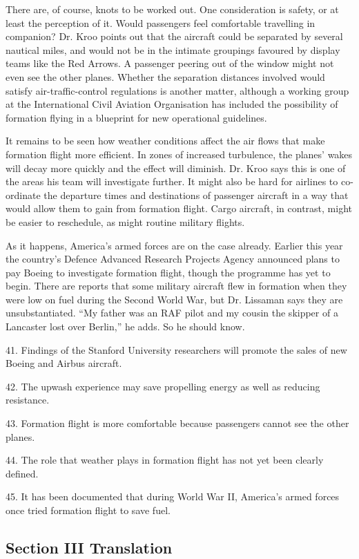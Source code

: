 \documentclass[UTF8,11pt]{ctexart}
\begin{document}
There are, of course, knots to be worked out. One consideration is safety, or at least the perception of it. Would passengers feel comfortable travelling in companion? Dr. Kroo points out that the aircraft could be separated by several nautical miles, and would not be in the intimate groupings favoured by display teams like the Red Arrows. A passenger peering out of the window might not even see the other planes. Whether the separation distances involved would satisfy air-traffic-control regulations is another matter, although a working group at the International Civil Aviation Organisation has included the possibility of formation flying in a blueprint for new operational guidelines.


It remains to be seen how weather conditions affect the air flows that make formation flight more efficient. In zones of increased turbulence, the planes’ wakes will decay more quickly and the effect will diminish. Dr. Kroo says this is one of the areas his team will investigate further. It might also be hard for airlines to co-ordinate the departure times and destinations of passenger aircraft in a way that would allow them to gain from formation flight. Cargo aircraft, in contrast, might be easier to reschedule, as might routine military flights.


As it happens, America’s armed forces are on the case already. Earlier this year the country’s Defence Advanced Research Projects Agency announced plans to pay Boeing to investigate formation flight, though the programme has yet to begin. There are reports that some military aircraft flew in formation when they were low on fuel during the Second World War, but Dr. Lissaman says they are unsubstantiated. “My father was an RAF pilot and my cousin the skipper of a Lancaster lost over Berlin,” he adds. So he should know.


41. Findings of the Stanford University researchers will promote the sales of new Boeing and Airbus aircraft.


42. The upwash experience may save propelling energy as well as reducing resistance.


43. Formation flight is more comfortable because passengers cannot see the other planes.


44. The role that weather plays in formation flight has not yet been clearly defined.


45. It has been documented that during World War II, America’s armed forces once tried formation flight to save fuel.


\subsection*{\textbf{Section III Translation}}
\end{document}
